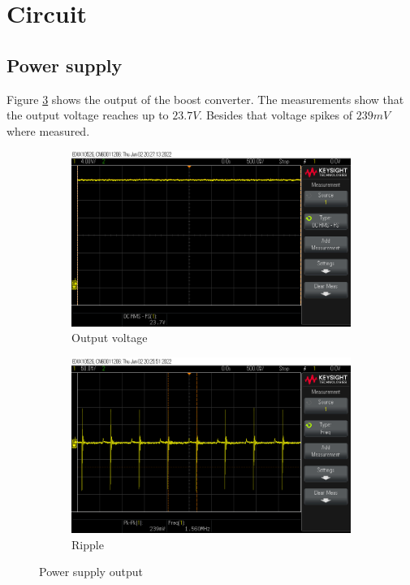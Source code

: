 \section{Circuit}

\subsection{Power supply}

Figure \ref{fig:meas:circ:power} shows the output of the boost converter. The measurements show that the output voltage reaches up to $23.7V$. Besides that voltage spikes of $239mV$ where measured.
%
\begin{figure}
  \centering
  \begin{subfigure}[b]{0.8\textwidth}
    \includegraphics[width=\textwidth]{src/assets/pictures/measurements/power_output_voltage.png}
    \caption{Output voltage}
    \label{fig:meas:circ:power_out}
  \end{subfigure}
  \hfill
  \begin{subfigure}[b]{0.8\textwidth}
    \includegraphics[width=\textwidth]{src/assets/pictures/measurements/power_ripple.png}
    \caption{Ripple}
    \label{fig:meas:circ:power_ripple}
  \end{subfigure}
  \caption{Power supply output}
  \label{fig:meas:circ:power}
\end{figure}

